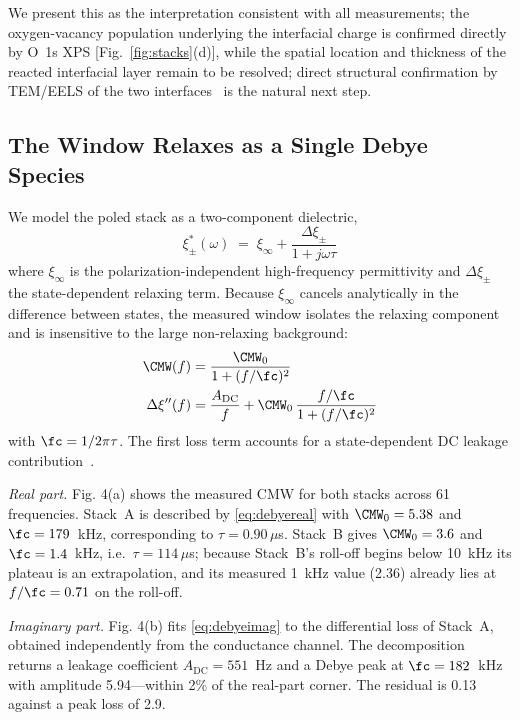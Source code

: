 We present
this as the interpretation consistent with all measurements; the oxygen-vacancy population underlying the interfacial charge is
confirmed directly by O~1s XPS [Fig.~\ref{fig:stacks}(d)], while the spatial
location and thickness of the reacted interfacial layer remain to be resolved;
direct structural confirmation by TEM/EELS of the two
interfaces~\cite{iung2025,kumar2025review,das2026paradox} is the natural next
step.

\subsection{The Window Relaxes as a Single Debye Species}
\label{sec:debye}
We model the poled stack as a two-component dielectric,
\begin{equation}
\xi^{*}_{\pm}(\omega) \;=\; \xi_\infty + \frac{\Delta\xi_\pm}{1+j\omega\tau}
\label{eq:twocomp}
\end{equation}
where $\xi_\infty$ is the polarization-independent high-frequency
permittivity and $\Delta\xi_\pm$ the state-dependent relaxing term. Because
$\xi_\infty$ cancels analytically in the difference between states, the
measured window isolates the relaxing component and is insensitive to the
large non-relaxing background:
\begin{align}
\CMW(f) &= \frac{\CMW_0}{1+(f/\fc)^2} \label{eq:debyereal}\\
\Delta\xi''(f) &= \frac{A_{\mathrm{DC}}}{f}
   + \CMW_0\,\frac{f/\fc}{1+(f/\fc)^2} \label{eq:debyeimag}
\end{align}
with $\fc = 1/2\pi\tau$. The first loss term accounts for a state-dependent
DC leakage contribution~\cite{nicollian1982,schroder2006}.

\textit{Real part.} Fig. 4(a) shows the measured CMW for
both stacks across 61 frequencies. Stack~A is described by
\eqref{eq:debyereal} with $\CMW_0 = 5.38$ and $\fc = 179$~kHz, corresponding
to $\tau = 0.90\,\mu$s. Stack~B gives $\CMW_0 = 3.6$ and $\fc = 1.4$~kHz,
i.e.\ $\tau = 114\,\mu$s; because Stack~B's roll-off begins below 10~kHz its
plateau is an extrapolation, and its measured 1~kHz value (2.36) already lies
at $f/\fc = 0.71$ on the roll-off.

\textit{Imaginary part.} Fig. 4(b) fits
\eqref{eq:debyeimag} to the differential loss of Stack~A, obtained
independently from the conductance channel. The decomposition returns a
leakage coefficient $A_{\mathrm{DC}} = 551$~Hz and a Debye peak at
$\fc = 182$~kHz with amplitude 5.94---within 2\% of the real-part corner. The
residual is 0.13 against a peak loss of 2.9.

